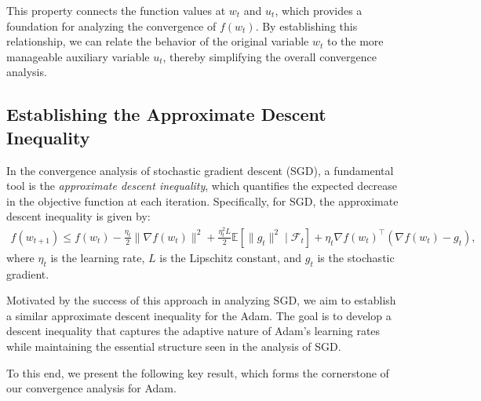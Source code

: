 \documentclass{article} %
\begin{document}
This property connects the function values at \( w_{t} \) and \( u_{t} \), which provides a foundation for analyzing the convergence of \( f(w_{t}) \). By establishing this relationship, we can relate the behavior of the original variable \( w_{t} \) to the more manageable auxiliary variable \( u_{t} \), thereby simplifying the overall convergence analysis.




\subsection{Establishing the Approximate Descent Inequality}

In the convergence analysis of stochastic gradient descent (SGD), a fundamental tool is the \emph{approximate descent inequality}, which quantifies the expected decrease in the objective function at each iteration. Specifically, for SGD, the approximate descent inequality is given by:
\begin{align}\label{sgd_descent}
f(w_{t+1})\leq f(w_{t}) - \frac{\eta_{t}}{2} \|\nabla f(w_{t})\|^{2} + \frac{\eta_{t}^{2} L}{2} \mathbb{E}[\|g_{t}\|^{2} \mid \mathscr{F}_{t}]+\eta_{t}\nabla f(w_{t})^{\top}(\nabla f(w_{t})-g_{t}),
\end{align}
where \( \eta_{t} \) is the learning rate, \( L \) is the Lipschitz constant, and \( g_{t} \) is the stochastic gradient.

Motivated by the success of this approach in analyzing SGD, we aim to establish a similar approximate descent inequality for the Adam. The goal is to develop a descent inequality that captures the adaptive nature of Adam's learning rates while maintaining the essential structure seen in the analysis of SGD. 

To this end, we present the following key result, which forms the cornerstone of our convergence analysis for Adam.
\end{document}
